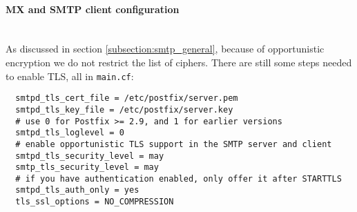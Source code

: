 




\paragraph*{MX and SMTP client configuration}\mbox{}\\

As discussed in section \ref{subsection:smtp_general}, because of opportunistic encryption we do not
restrict the list of ciphers. There are still some steps needed to
enable TLS, all in \verb|main.cf|:

\begin{lstlisting}
  smtpd_tls_cert_file = /etc/postfix/server.pem
  smtpd_tls_key_file = /etc/postfix/server.key
  # use 0 for Postfix >= 2.9, and 1 for earlier versions
  smtpd_tls_loglevel = 0
  # enable opportunistic TLS support in the SMTP server and client
  smtpd_tls_security_level = may
  smtp_tls_security_level = may
  # if you have authentication enabled, only offer it after STARTTLS
  smtpd_tls_auth_only = yes
  tls_ssl_options = NO_COMPRESSION
\end{lstlisting}

